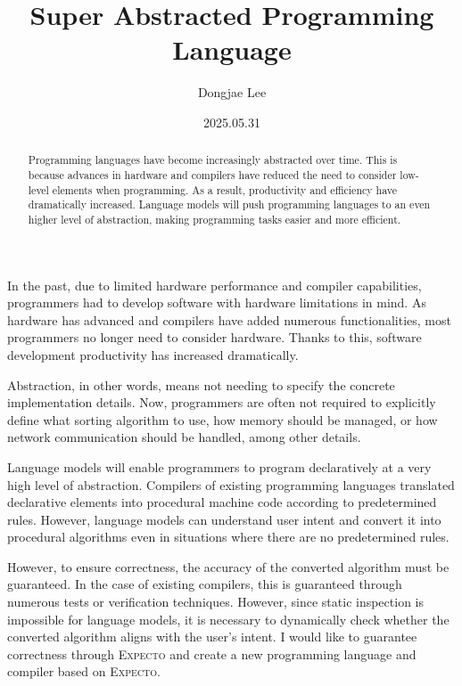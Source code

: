 \documentclass[11pt, oneside]{article}
\title{Super Abstracted Programming Language}
\author{Dongjae Lee}
\date{2025.05.31}
\begin{document}
\maketitle

\begin{abstract}
	Programming languages have become increasingly abstracted over time. This is because advances in hardware and compilers have reduced the need to consider low-level elements when programming. As a result, productivity and efficiency have dramatically increased. Language models will push programming languages to an even higher level of abstraction, making programming tasks easier and more efficient.
\end{abstract}

In the past, due to limited hardware performance and compiler capabilities,
programmers had to develop software with hardware limitations in mind. As
hardware has advanced and compilers have added numerous functionalities, most
programmers no longer need to consider hardware. Thanks to this, software
development productivity has increased dramatically.

Abstraction, in other words, means not needing to specify the concrete
implementation details. Now, programmers are often not required to explicitly
define what sorting algorithm to use, how memory should be managed, or how
network communication should be handled, among other details.

Language models will enable programmers to program declaratively at a very high
level of abstraction. Compilers of existing programming languages translated
declarative elements into procedural machine code according to predetermined
rules. However, language models can understand user intent and convert it into
procedural algorithms even in situations where there are no predetermined
rules.

However, to ensure correctness, the accuracy of the converted algorithm must be
guaranteed. In the case of existing compilers, this is guaranteed through
numerous tests or verification techniques. However, since static inspection is
impossible for language models, it is necessary to dynamically check whether
the converted algorithm aligns with the user's intent. I would like to
guarantee correctness through \textsc{Expecto} and create a new programming
language and compiler based on \textsc{Expecto}.
\end{document}
